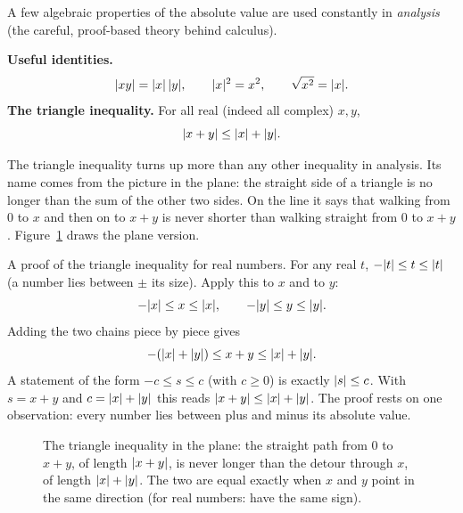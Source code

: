 A few algebraic properties of the absolute value are used constantly in
\emph{analysis} (the careful, proof-based theory behind calculus).

\begin{focusbox}
\textbf{Useful identities.}
\[
  \lvert xy\rvert = \lvert x\rvert\,\lvert y\rvert, \qquad \lvert x\rvert^2 = x^2, \qquad \sqrt{x^2}=\lvert x\rvert.
\]
\textbf{The triangle inequality.} For all real (indeed all complex) $x,y$,
\[
  \lvert x+y\rvert \le \lvert x\rvert + \lvert y\rvert.
\]
\end{focusbox}

The triangle inequality turns up more than any other inequality in analysis.
Its name comes from the picture in the plane: the straight side of a triangle is no
longer than the sum of the other two sides. On the line it says that walking from
$0$ to $x$ and then on to $x+y$ is never shorter than walking straight from $0$ to
$x+y$. Figure~\ref{ch40:fig-triangle-ineq} draws the plane version.

\begin{whybox}
A proof of the triangle inequality for real numbers. For any real $t$, $-\lvert t\rvert \le t
\le \lvert t\rvert$ (a number lies between $\pm$ its size). Apply this to $x$ and to $y$:
\[
  -\lvert x\rvert \le x \le \lvert x\rvert, \qquad -\lvert y\rvert \le y \le \lvert y\rvert.
\]
Adding the two chains piece by piece gives
\[
  -(\lvert x\rvert + \lvert y\rvert) \le x + y \le \lvert x\rvert + \lvert y\rvert.
\]
A statement of the form $-c \le s \le c$ (with $c \ge 0$) is exactly
$\lvert s\rvert \le c$. With $s = x+y$ and $c = \lvert x\rvert + \lvert y\rvert$ this reads
$\lvert x+y\rvert \le \lvert x\rvert + \lvert y\rvert$. The proof rests on one observation:
every number lies between plus and minus its absolute value.
\end{whybox}

\begin{figure}[htbp]
\centering
{}
\caption{The triangle inequality in the plane: the straight path from $0$ to $x+y$, of length $\lvert x+y\rvert$, is never longer than the detour through $x$, of length $\lvert x\rvert + \lvert y\rvert$. The two are equal exactly when $x$ and $y$ point in the same direction (for real numbers: have the same sign).}
\label{ch40:fig-triangle-ineq}
\end{figure}

